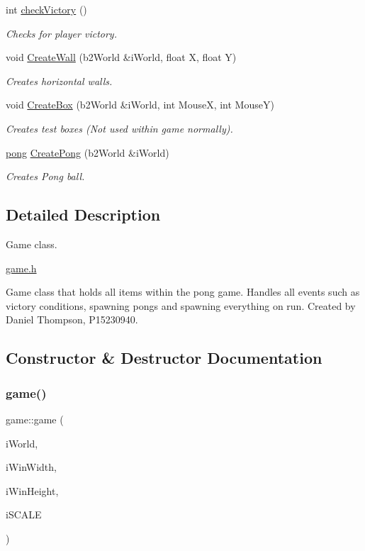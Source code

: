 \begin{DoxyCompactItemize}
int \hyperlink{classgame_a5297f3ca1e18dfc8c4efd718b54b4982}{check\+Victory} ()
\begin{DoxyCompactList}\small\item\em Checks for player victory. \end{DoxyCompactList}\item 
void \hyperlink{classgame_acdaf7a10e6f337765c240aa00c98bb29}{Create\+Wall} (b2\+World \&i\+World, float X, float Y)
\begin{DoxyCompactList}\small\item\em Creates horizontal walls. \end{DoxyCompactList}\item 
void \hyperlink{classgame_ae657176251e07dae30036032635322fc}{Create\+Box} (b2\+World \&i\+World, int MouseX, int MouseY)
\begin{DoxyCompactList}\small\item\em Creates test boxes (Not used within game normally). \end{DoxyCompactList}\item 
\hyperlink{classpong}{pong} \hyperlink{classgame_aa1ba656bd20a57049233b02d247ff24b}{Create\+Pong} (b2\+World \&i\+World)
\begin{DoxyCompactList}\small\item\em Creates Pong ball. \end{DoxyCompactList}\end{DoxyCompactItemize}


\subsection{Detailed Description}
Game class. 

\hyperlink{game_8h}{game.\+h}

Game class that holds all items within the pong game. Handles all events such as victory conditions, spawning pongs and spawning everything on run. Created by Daniel Thompson, P15230940. 

\subsection{Constructor \& Destructor Documentation}
\mbox{\label{classgame_a57f5809d56037158e9bafa65c8173609}} 
\subsubsection{\texorpdfstring{game()}{game()}}
{\footnotesize\ttfamily game\+::game (\begin{DoxyParamCaption}\item[{b2\+World \&}]{i\+World,  }\item[{int}]{i\+Win\+Width,  }\item[{int}]{i\+Win\+Height,  }\item[{double}]{i\+S\+C\+A\+LE }\end{DoxyParamCaption})}



